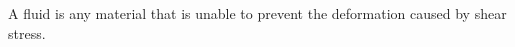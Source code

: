 \begin{definition}
  A fluid is any material that is unable to prevent the deformation caused by shear stress.
\end{definition}
